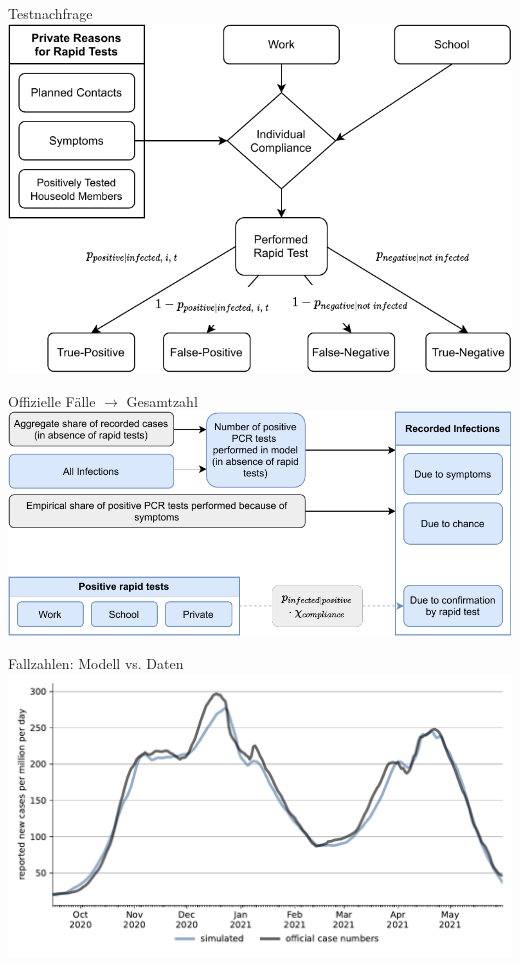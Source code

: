 \documentclass[11pt]{beamer}
\begin{document}
\begin{frame}{Testnachfrage}
    \centering
    \includegraphics[width=\textwidth]{figures/model-graph-bottom-left}
\end{frame}


\begin{frame}{Offizielle Fälle $\rightarrow$ Gesamtzahl}
    \centering
    \includegraphics[width=\textwidth]{figures/model-graph-bottom-right}
\end{frame}


\begin{frame}{Fallzahlen: Modell vs. Daten}
    \centering
    \includegraphics[width=\textwidth]{figures/results/figures/scenario_comparisons/combined_fit/full_new_known_case}
\end{frame}
\end{document}
